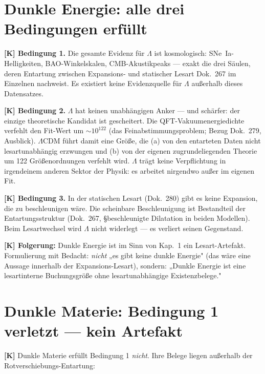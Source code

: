\documentclass[11pt]{report}
\begin{document}
\chapter{Dunkle Energie: alle drei Bedingungen erfüllt}

\textbf{[K] Bedingung 1.} Die gesamte Evidenz für $\Lambda$ ist
kosmologisch: SNe~Ia-Helligkeiten, BAO-Winkelskalen, CMB-Akustikpeaks —
exakt die drei Säulen, deren Entartung zwischen Expansions- und
statischer Lesart Dok.~267 im Einzelnen nachweist. Es existiert keine
Evidenzquelle für $\Lambda$ außerhalb dieses Datensatzes.

\medskip
\textbf{[K] Bedingung 2.} $\Lambda$ hat keinen unabhängigen Anker —
und schärfer: der einzige theoretische Kandidat ist gescheitert. Die
QFT-Vakuumenergiedichte verfehlt den Fit-Wert um $\sim 10^{122}$
(das Feinabstimmungsproblem; Bezug Dok.~279, Ausblick). $\Lambda$CDM
führt damit eine Größe, die (a) von den entarteten Daten nicht
lesartunabhängig erzwungen und (b) von der eigenen zugrundeliegenden
Theorie um 122 Größenordnungen verfehlt wird. $\Lambda$ trägt keine
Verpflichtung in irgendeinem anderen Sektor der Physik: es arbeitet
nirgendwo außer im eigenen Fit.

\medskip
\textbf{[K] Bedingung 3.} In der statischen Lesart (Dok.~280) gibt es
keine Expansion, die zu beschleunigen wäre. Die scheinbare
Beschleunigung ist Bestandteil der Entartungsstruktur (Dok.~267,
\S{}beschleunigte Dilatation in beiden Modellen). Beim Lesartwechsel
wird $\Lambda$ nicht widerlegt — es verliert seinen Gegenstand.

\medskip
\noindent\textbf{[K] Folgerung:} Dunkle Energie ist im Sinn von Kap.~1 ein
Lesart-Artefakt. Formulierung mit Bedacht: \emph{nicht} „es gibt keine
dunkle Energie" (das wäre eine Aussage innerhalb der Expansions-Lesart),
sondern: „Dunkle Energie ist eine lesartinterne Buchungsgröße ohne
lesartunabhängige Existenzbelege."

\chapter{Dunkle Materie: Bedingung 1 verletzt — kein Artefakt}

\textbf{[K]} Dunkle Materie erfüllt Bedingung 1 \emph{nicht}. Ihre Belege liegen
außerhalb der Rotverschiebungs-Entartung:
\end{document}
